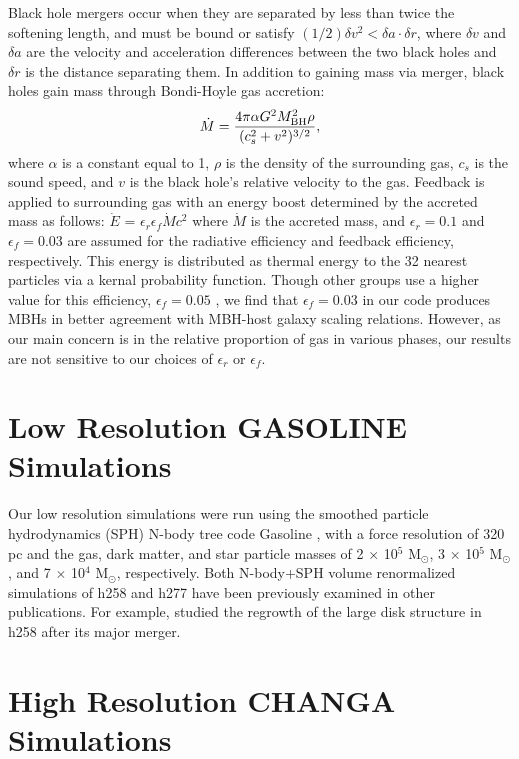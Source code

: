 \documentclass[12pt,headA,chapB]{fiskthesis}
\begin{document}
Black hole mergers occur when they are separated by less than twice the softening length, and must be bound or satisfy $(1/2) \delta v^2 < \delta a \cdot \delta r$,  where $\delta v$ and $\delta a$ are the velocity and acceleration differences between the two black holes and $\delta r$ is the distance separating them. In addition to gaining mass via merger, black holes gain mass through Bondi-Hoyle gas accretion:
\begin{equation}
\dot{M} = \frac{4 \pi \alpha G^2 M^{2}_{\rm BH} \rho}{(c^{2}_{s} + v^2)^{3/2}},
\end{equation}
where $\alpha$ is a constant equal to 1, $\rho$ is the density of the surrounding gas, $c_s$ is the sound speed, and $v$ is the black hole's relative velocity to the gas. Feedback is applied to surrounding gas with an energy boost determined by the accreted mass as follows: $\dot{E}$ = $\epsilon _{r}$$\epsilon_{f}$$\dot{M}$$c^2$ where $\dot{M}$ is the accreted mass, and $\epsilon _r = 0.1$ and $\epsilon _f = 0.03$ are assumed for the radiative efficiency and feedback efficiency, respectively. This energy is distributed as thermal energy to the 32 nearest particles via a kernal probability function. Though other groups use a higher value for this efficiency, $\epsilon _f = 0.05$ \citep{Sijacki2007,DiMatteo2008}, we find that $\epsilon_f = 0.03$ in our code produces MBHs in better agreement with MBH-host galaxy scaling relations. However, as our main concern is in the relative proportion of gas in various phases, our results are not sensitive to our choices of $\epsilon _{r}$ or $\epsilon_{f}$.
 
\section{\normalsize Low Resolution GASOLINE Simulations}

Our low resolution simulations were run using the smoothed particle hydrodynamics (SPH) N-body tree code Gasoline \citep{Wadsley2004}, with a force resolution of 320 pc and the gas, dark matter, and star particle masses of 2 $\times$ 10$^5$ M$_{\odot}$, 3 $\times$ 10$^5$ M$_{\odot}$, and 7 $\times$ 10$^4$ M$_{\odot}$, respectively. Both N-body+SPH volume renormalized simulations of h258 and h277 have been previously examined in other publications. For example, \cite{Governato2009} studied the regrowth of the large disk structure in h258 after its major merger. 
	
\section{\normalsize High Resolution CHANGA Simulations}
\end{document}
